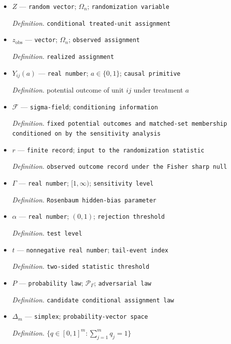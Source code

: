 \documentclass{article}
\begin{document}
\begin{itemize}
  \item \(Z\) --- \texttt{random vector}; \(\Omega_n\); \texttt{randomization variable}
  \par\smallskip\noindent\emph{Definition.} \texttt{conditional treated-\allowbreak{}unit assignment}
  \item \(z_{\mathrm{obs}}\) --- \texttt{vector}; \(\Omega_n\); \texttt{observed assignment}
  \par\smallskip\noindent\emph{Definition.} \texttt{realized assignment}
  \item \(Y_{ij}(a)\) --- \texttt{real number}; \(a\in\{0,1\}\); \texttt{causal primitive}
  \par\smallskip\noindent\emph{Definition.} potential outcome of unit \(ij\) under treatment \(a\)
  \item \(\mathcal F\) --- \texttt{sigma-\allowbreak{}field}; \texttt{conditioning information}
  \par\smallskip\noindent\emph{Definition.} \texttt{fixed potential outcomes and matched-\allowbreak{}set membership conditioned on by the sensitivity analysis}
  \item \(r\) --- \texttt{finite record}; \texttt{input to the randomization statistic}
  \par\smallskip\noindent\emph{Definition.} \texttt{observed outcome record under the Fisher sharp null}
  \item \(\Gamma\) --- \texttt{real number}; \([1,\infty)\); \texttt{sensitivity level}
  \par\smallskip\noindent\emph{Definition.} \texttt{Rosenbaum hidden-\allowbreak{}bias parameter}
  \item \(\alpha\) --- \texttt{real number}; \((0,1)\); \texttt{rejection threshold}
  \par\smallskip\noindent\emph{Definition.} \texttt{test level}
  \item \(t\) --- \texttt{nonnegative real number}; \texttt{tail-\allowbreak{}event index}
  \par\smallskip\noindent\emph{Definition.} \texttt{two-\allowbreak{}sided statistic threshold}
  \item \(P\) --- \texttt{probability law}; \(\mathcal P_\Gamma\); \texttt{adversarial law}
  \par\smallskip\noindent\emph{Definition.} \texttt{candidate conditional assignment law}
  \item \(\Delta_m\) --- \texttt{simplex}; \texttt{probability-\allowbreak{}vector space}
  \par\smallskip\noindent\emph{Definition.} \(\{q\in[0,1]^m:\sum_{j=1}^m q_j=1\}\)

\end{itemize}
\end{document}
